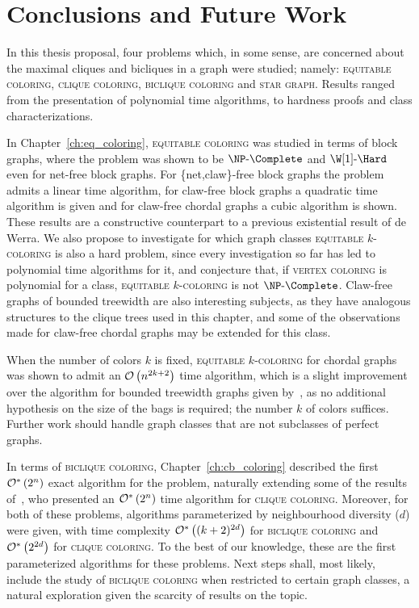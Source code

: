 \chapter{Conclusions and Future Work}
\label{ch:cfw}

In this thesis proposal, four problems which, in some sense, are concerned about the maximal cliques and bicliques in a graph were studied;
namely: \textsc{equitable coloring}, \textsc{clique coloring}, \textsc{biclique coloring} and \textsc{star graph}.
Results ranged from the presentation of polynomial time algorithms, to hardness proofs and class characterizations.

In Chapter~\ref{ch:eq_coloring}, \textsc{equitable coloring} was studied in terms of block graphs, where the problem was shown to be $\NPc$ and $\W[1]\text{-}\Hard$ even for net-free block graphs.
For \{net,claw\}-free block graphs the problem admits a linear time algorithm, for claw-free block graphs a quadratic time algorithm is given and for claw-free chordal graphs a cubic algorithm is shown.
These results are a constructive counterpart to a previous existential result of de Werra.
We also propose to investigate for which graph classes \textsc{equitable $k$-coloring} is also a hard problem, since every investigation so far has led to polynomial time algorithms for it, and conjecture that, if \textsc{vertex coloring} is polynomial for a class, \textsc{equitable $k$-coloring} is not $\NPc$.
Claw-free graphs of bounded treewidth are also interesting subjects, as they have analogous structures to the clique trees used in this chapter, and some of the observations made for claw-free chordal graphs may be extended for this class.

When the number of colors $k$ is fixed, \textsc{equitable $k$-coloring} for chordal graphs was shown to admit an $\mathcal{O}\left(n^{2k + 2}\right)$ time algorithm, which is a slight improvement over the algorithm for bounded treewidth graphs given by~\citep{equitable_treewidth}, as no additional hypothesis on the size of the bags is required; the number $k$ of colors suffices.
Further work should handle graph classes that are not subclasses of perfect graphs.

In terms of \textsc{biclique coloring}, Chapter~\ref{ch:cb_coloring} described the first $\mathcal{O}^*\left(2^n\right)$ exact algorithm for the problem, naturally extending some of the results of~\citep{clique_color_algorithm}, who presented an $\mathcal{O}^*\left(2^n\right)$ time algorithm for \textsc{clique coloring}.
Moreover, for both of these problems, algorithms parameterized by neighbourhood diversity ($d$) were given, with time complexity $\mathcal{O}^*\left((k + 2)^{2d}\right)$ for \textsc{biclique coloring} and $\mathcal{O}^*\left(2^{2d}\right)$ for \textsc{clique coloring}.
To the best of our knowledge, these are the first parameterized algorithms for these problems.
Next steps shall, most likely, include the study of \textsc{biclique coloring} when restricted to certain graph classes, a natural exploration given the scarcity of results on the topic.

